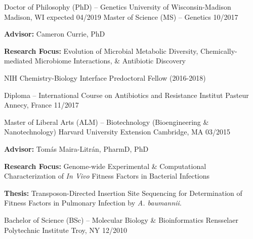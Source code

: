 {}

\begin{cventries}
\cventry
	{Doctor of Philosophy (PhD) -- Genetics}
	{University of Wisconsin-Madison}
	{Madison, WI}
	{expected 04/2019}
	{}
	\vspace{-0.4cm}
\cventry
	{Master of Science (MS) -- Genetics}
	{}
	{}
	{10/2017}
	{
      \begin{cvitems}
      	\item {\textbf{Advisor:} Cameron Currie, PhD}
      	\item {\textbf{Research Focus:} Evolution of Microbial Metabolic Diversity, Chemically-mediated Microbiome Interactions, \& Antibiotic Discovery}
      	\item {NIH Chemistry-Biology Interface Predoctoral Fellow (2016-2018)}
      \end{cvitems}
    }
    
\cventry
	{Diploma -- International Course on Antibiotics and Resistance}
	{Institut Pasteur}
	{Annecy, France}
	{11/2017}
	{} \vspace{-4mm}
    
\cventry
	{Master of Liberal Arts (ALM) -- Biotechnology (Bioengineering \& Nanotechnology)}
	{Harvard University Extension}
	{Cambridge, MA}
	{03/2015}
	{
      \begin{cvitems}
      	\item {\textbf{Advisor:} Tom\'{a}s Maira-Litr\'{a}n, PharmD, PhD}
      	\item {\textbf{Research Focus:} Genome-wide Experimental \& Computational Characterization of \textit{In Vivo} Fitness Factors in Bacterial Infections}
      	\item {\textbf{Thesis:} Transposon-Directed Insertion Site Sequencing for Determination of Fitness Factors in Pulmonary Infection by \textit{A. baumannii}.}
      \end{cvitems}
    }

\cventry
	{Bachelor of Science (BSc) -- Molecular Biology \& Bioinformatics}
	{Rensselaer Polytechnic Institute}
	{Troy, NY}
	{12/2010}
	{}
\end{cventries}

\vspace{-7mm}